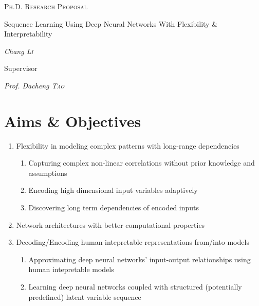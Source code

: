\documentclass{article} \usepackage{tabularx}
\begin{document}
\begin{titlepage}
	\centering
	\begin{figure}[H]
    \centering
	\end{figure}
	\vspace{2cm} {\scshape\LARGE Ph.D. Research Proposal\par}
  \vspace{2cm}
  
	{\scshape\LARGE

    Sequence Learning Using Deep Neural Networks With Flexibility
    \& Interpretability
    
    \par} {\huge\bfseries \par}
	
	\vspace{2cm} {\Large\itshape Chang \textsc{Li}\par} \vfill

  {\Large Supervisor\par} {\Large\itshape Prof. Dacheng
    \textsc{Tao}\par} \vfill

\end{titlepage}


\section{Aims \& Objectives}

\begin{enumerate}
\item Flexibility in modeling complex patterns with long-range
  dependencies
  \begin{enumerate}
  \item Capturing complex non-linear correlations without prior
    knowledge and assumptions
  \item Encoding high dimensional input variables adaptively
  \item Discovering long term dependencies of encoded inputs
  \end{enumerate}
\item Network architectures with better computational properties
\item Decoding/Encoding human intepretable representations
  from/into models
  \begin{enumerate}
  \item Approximating deep neural networks' input-output
    relationships using human intepretable models
  \item Learning deep neural networks coupled with structured
    (potentially predefined) latent variable sequence
  \end{enumerate}
\end{enumerate}
\end{document}
